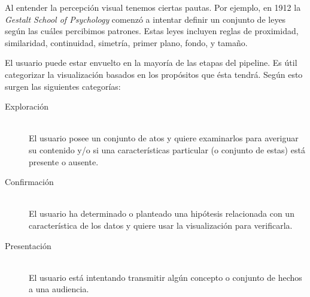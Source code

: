 \documentclass[12pt]{article}
\begin{document}
Al entender la percepción visual tenemos ciertas pautas. Por ejemplo, en 1912 la \textit{Gestalt School of Psychology} comenzó a intentar definir un conjunto de leyes según las cuáles percibimos patrones. Estas leyes incluyen reglas de proximidad, similaridad, continuidad, simetría, primer plano, fondo, y tamaño.


El usuario puede estar envuelto en la mayoría de las etapas del pipeline. Es útil categorizar la visualización basados en los propósitos que ésta tendrá. Según esto surgen las siguientes categorías:

\begin{description}
	\item[Exploración] \hfill \\
El usuario posee un conjunto de atos y quiere examinarlos para averiguar su contenido y/o si una características particular (o conjunto de estas)  está presente o ausente.

	\item[Confirmación] \hfill \\
El usuario ha determinado o planteado una hipótesis relacionada con un característica de los datos y quiere usar la visualización para verificarla.

	\item[Presentación] \hfill \\
El usuario está intentando transmitir algún concepto o conjunto de hechos a una audiencia.
\end{description}





    
    
\end{document}
